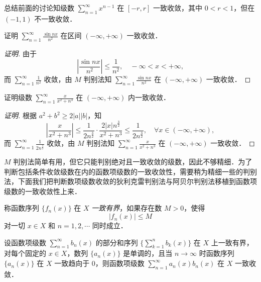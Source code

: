 总结前面的讨论知级数 $\displaystyle\sum_{n=1}^{\infty}x^{n-1}$ 在 $[-r,r]$ 一致收敛，其中 $0<r<1$，但在 $(-1,1)$ 不一致收敛．

\begin{example}\label{ex:12-2-7}
证明 $\displaystyle\sum_{n=1}^{\infty}\frac{\sin nx}{n^{2}}$ 在区间 $(-\infty,+\infty)$ 一致收敛．
\end{example}

\begin{proof}[证明]
由于
\[
\left|\frac{\sin nx}{n^{2}}\right|\leqslant\frac{1}{n^{2}},\quad-\infty<x<+\infty,
\]
而 $\displaystyle\sum_{n=1}^{\infty}\frac{1}{n^{2}}$ 收敛，由 $M$ 判别法知 $\displaystyle\sum_{n=1}^{\infty}\frac{\sin nx}{n^{2}}$ 在 $(-\infty,+\infty)$ 一致收敛．
\end{proof}

\begin{example}\label{ex:12-2-8}
证明级数 $\displaystyle\sum_{n=1}^{\infty}\frac{x}{x^{2}+n^{3}}$ 在 $(-\infty,+\infty)$ 内一致收敛．
\end{example}

\begin{proof}[证明]
根据 $a^{2}+b^{2}\geqslant 2\left|a\right|\left|b\right|$，知
\[
\left|\frac{x}{x^{2}+n^{3}}\right|\leqslant\frac{1}{2n^{\frac{3}{2}}}\cdot\frac{2\left|x\right|n^{\frac{3}{2}}}{x^{2}+n^{3}}\leqslant\frac{1}{2n^{\frac{3}{2}}},\quad\forall x\in(-\infty,+\infty),
\]
而 $\displaystyle\sum_{n=1}^{\infty}\frac{1}{2n^{\frac{3}{2}}}$ 收敛，由 $M$ 判别法知 $\displaystyle\sum_{n=1}^{\infty}\frac{x}{x^{2}+n^{3}}$ 在 $(-\infty,+\infty)$ 一致收敛．
\end{proof}

$M$ 判别法简单有用，但它只能判别绝对且一致收敛的级数，因此不够精细．为了判断包括条件收敛级数在内的函数项级数的一致收敛性，需要稍为精细一些的判别法，下面我们把判断数项级数收敛的狄利克雷判别法与阿贝尔判别法移植到函数项级数的一致收敛性上来．

\begin{definition}\label{def:12-3}
称函数序列 $\{f_{n}(x)\}$ 在 $X$ \emph{一致有界}，如果存在数 $M>0$，使得
\[
\left|f_{n}(x)\right|\leqslant M
\]
对一切 $x\in X$ 和 $n=1,2,\cdots$ 同时成立．
\end{definition}

\begin{theorem}[狄利克雷判别法]\label{thm:12-7}
设函数项级数 $\displaystyle\sum_{n=1}^{\infty}b_{n}(x)$ 的部分和序列 $\big\{\displaystyle\sum_{k=1}^{n}b_{k}(x)\big\}$ 在 $X$ 上一致有界，对每个固定的 $x\in X$，数列 $\{a_{n}(x)\}$ 是单调的，且当 $n\to\infty$ 时函数序列 $\{a_{n}(x)\}$ 在 $X$ 一致趋向于 $0$，则函数项级数 $\displaystyle\sum_{n=1}^{\infty}a_{n}(x)b_{n}(x)$ 在 $X$ 一致收敛．
\end{theorem}


